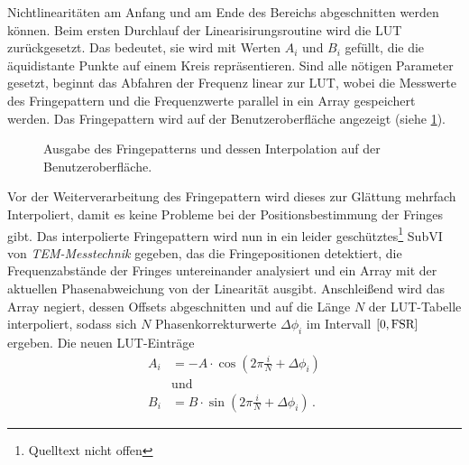 Nichtlinearitäten am Anfang und am Ende des Bereichs abgeschnitten werden
können. Beim ersten Durchlauf der Linearisirungsroutine wird die LUT
zurückgesetzt. Das bedeutet, sie wird mit Werten $A_i$ und $B_i$ gefüllt, die
die äquidistante Punkte auf einem Kreis repräsentieren. Sind alle nötigen
Parameter gesetzt, beginnt das Abfahren der Frequenz linear zur LUT, wobei die
Messwerte des Fringepattern und die Frequenzwerte parallel in ein Array
gespeichert werden. Das Fringepattern wird auf der
Benutzeroberfläche angezeigt (siehe
\ref{fig:linearisierung_benutzeroberflaeche_fringepattern}).\par
\begin{figure}[h]
 	\centering
	\caption[Benutzeroberfläche Linearisierung -
	Fringepattern]{Ausgabe des Fringepatterns und dessen Interpolation auf der
	Benutzeroberfläche.}\label{fig:linearisierung_benutzeroberflaeche_fringepattern}
\end{figure}
Vor der Weiterverarbeitung des Fringepattern wird dieses zur Glättung mehrfach
Interpoliert, damit es keine Probleme bei der Positionsbestimmung der Fringes
gibt. Das interpolierte Fringepattern wird nun in ein leider
geschütztes\footnote{Quelltext nicht offen} SubVI von \textit{TEM-Messtechnik}
gegeben, das die Fringepositionen detektiert, die Frequenzabstände der Fringes
untereinander analysiert und ein Array mit der aktuellen Phasenabweichung von
der Linearität ausgibt. Anschleißend wird das Array negiert, dessen Offsets
abgeschnitten und auf die Länge $N$ der LUT-Tabelle interpoliert, sodass sich
$N$ Phasenkorrekturwerte $\Delta\phi_i$ im Intervall
$[0,\text{\lstinline|FSR|}]$ ergeben. Die neuen LUT-Einträge
\begin{equation}\label{eq:LUT_korrektur_01}
	\begin{split}
		A_i&=-A\cdot\cos{\left(2\pi\frac{i}{N}+\Delta\phi_i\right)}\\
		&\text{und}\\
		B_i&=B\cdot\sin{\left(2\pi\frac{i}{N}+\Delta\phi_i\right)}\,.
	\end{split}
\end{equation}
